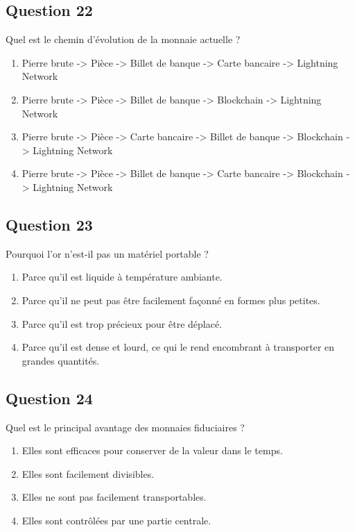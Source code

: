 \documentclass[12pt,a4paper]{article}
\begin{document}
\bigskip


\subsection*{Question 22}
Quel est le chemin d'évolution de la monnaie actuelle ?

\begin{enumerate}[label=\Alph*., leftmargin=*]
\item Pierre brute -> Pièce -> Billet de banque -> Carte bancaire -> Lightning Network
\item Pierre brute -> Pièce -> Billet de banque -> Blockchain -> Lightning Network
\item Pierre brute -> Pièce -> Carte bancaire -> Billet de banque -> Blockchain -> Lightning Network
\item Pierre brute -> Pièce -> Billet de banque -> Carte bancaire -> Blockchain -> Lightning Network
\end{enumerate}

\bigskip


\subsection*{Question 23}
Pourquoi l'or n'est-il pas un matériel portable ?

\begin{enumerate}[label=\Alph*., leftmargin=*]
\item Parce qu'il est liquide à température ambiante.
\item Parce qu'il ne peut pas être facilement façonné en formes plus petites.
\item Parce qu'il est trop précieux pour être déplacé.
\item Parce qu'il est dense et lourd, ce qui le rend encombrant à transporter en grandes quantités.
\end{enumerate}

\bigskip


\subsection*{Question 24}
Quel est le principal avantage des monnaies fiduciaires ?

\begin{enumerate}[label=\Alph*., leftmargin=*]
\item Elles sont efficaces pour conserver de la valeur dans le temps.
\item Elles sont facilement divisibles.
\item Elles ne sont pas facilement transportables.
\item Elles sont contrôlées par une partie centrale.
\end{enumerate}
\end{document}
